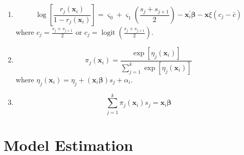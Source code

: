 \begin{enumerate}
    \item \begin{equation}
              \log\left[\frac{r_{j}\left(\mathbf{x}_{i}\right)}{1-r_{j}\left(\mathbf{x}_{i}\right)}\right]=\varsigma_{0}+\varsigma_{1}\left(\frac{s_{j}+s_{j+1}}{2}\right)-\mathbf{x}_{i}^{\prime}\boldsymbol{\beta}-\mathbf{x}\xi\left(c_{j}-\bar{c}\right)
          \end{equation}
          where $c_{j}=\frac{s_{j}+s_{j+1}}{2}$ or $c_{j}=\operatorname{logit}\left(\frac{s_{j}+s_{j+1}}{2}\right)$.
    \item \begin{equation}
              \pi_{j}\left(\mathbf{x}_{i}\right)=\frac{\exp \left[\eta_{j}\left(\mathbf{x}_{i}\right)\right]}{\sum_{j=1}^{k} \exp \left[\eta_{j}\left(\mathbf{x}_{i}\right)\right]}
          \end{equation}
          where $\eta_{j}\left(\mathbf{x}_{i}\right)=\eta_{j}+\left(\mathbf{x}_{i}\boldsymbol{\beta}\right)s_{j}+\alpha_{i}$.
    \item \begin{equation}
              \sum_{j=1}^{k}\pi_{j}\left(\mathbf{x}_{i}\right)s_{j}=\mathbf{x}_{i}\boldsymbol{\beta}
          \end{equation}
\end{enumerate}

\section{Model Estimation}